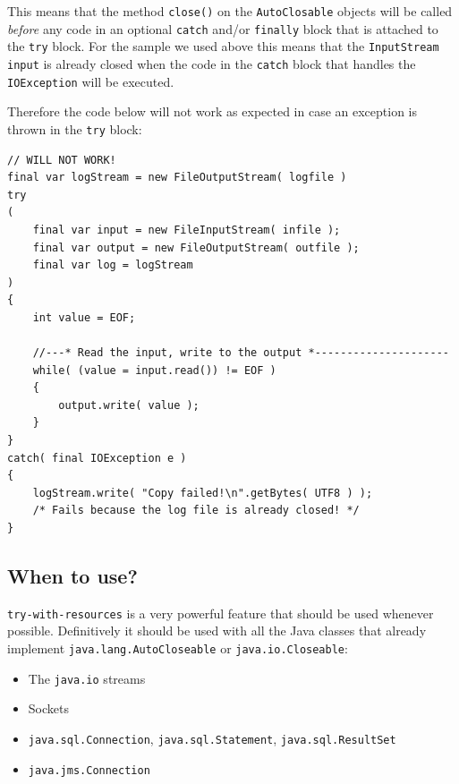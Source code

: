 \documentclass[12pt,a4paper,titlepage, parskip=half, headsepline, footsepline, cleardoubleplain]{scrbook}
\begin{document}
This means that the method \lstinline|close()| on the \lstinline|AutoClosable| objects will be called \textit{before} any code in an optional \lstinline|catch| and/or \lstinline|finally| block that is attached to the \lstinline|try| block. For the sample we used above this means that the \lstinline|InputStream input| is already closed when the code in the \lstinline|catch| block that handles the \lstinline|IOException| will be executed.

Therefore the code below will not work as expected in case an exception is thrown in the \lstinline|try| block:
\begin{lstlisting}
// WILL NOT WORK!
final var logStream = new FileOutputStream( logfile )
try
(   
    final var input = new FileInputStream( infile );
    final var output = new FileOutputStream( outfile );
    final var log = logStream 
)
{
	int value = EOF;
	
    //---* Read the input, write to the output *---------------------
    while( (value = input.read()) != EOF )
    {
        output.write( value );
    }
}
catch( final IOException e )
{
    logStream.write( "Copy failed!\n".getBytes( UTF8 ) );
    /* Fails because the log file is already closed! */
}
\end{lstlisting}

\subsection{When to use?}
\lstinline|try-with-resources| is a very powerful feature that should be used whenever possible. Definitively it should be used with all the Java classes that already implement \lstinline|java.lang.AutoCloseable| or \lstinline|java.io.Closeable|:

\begin{itemize}
\item{The \lstinline|java.io| streams}
\item{Sockets}
\item{\lstinline|java.sql.Connection|, \lstinline|java.sql.Statement|, \lstinline|java.sql.ResultSet|}
\item{\lstinline|java.jms.Connection|}
\end{itemize}
\end{document}
